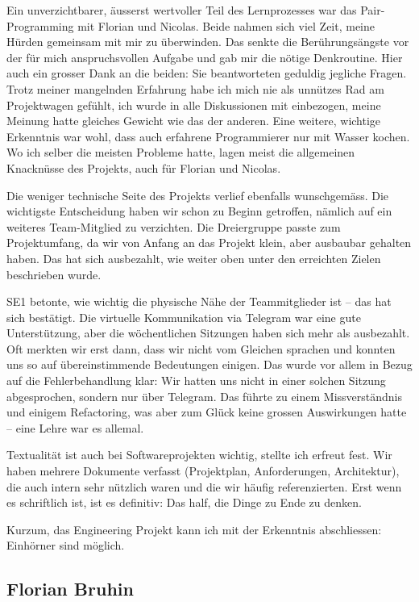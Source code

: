 \documentclass[a4paper]{article}
\begin{document}
Ein unverzichtbarer, äusserst wertvoller Teil des Lernprozesses war das Pair-Programming mit Florian und Nicolas. Beide nahmen sich viel Zeit, meine Hürden gemeinsam mit mir zu überwinden. Das senkte die Berührungsängste vor der für mich anspruchsvollen Aufgabe und gab mir die nötige Denkroutine. Hier auch ein grosser Dank an die beiden: Sie beantworteten geduldig jegliche Fragen. Trotz meiner mangelnden Erfahrung habe ich mich nie als unnützes Rad am Projektwagen gefühlt, ich wurde in alle Diskussionen mit einbezogen, meine Meinung hatte gleiches Gewicht wie das der anderen. Eine weitere, wichtige Erkenntnis war wohl, dass auch erfahrene Programmierer nur mit Wasser kochen. Wo ich selber die meisten Probleme hatte, lagen meist die allgemeinen Knacknüsse des Projekts, auch für Florian und Nicolas.

Die weniger technische Seite des Projekts verlief ebenfalls wunschgemäss. Die wichtigste Entscheidung haben wir schon zu Beginn getroffen, nämlich auf ein weiteres Team-Mitglied zu verzichten. Die Dreiergruppe passte zum Projektumfang, da wir von Anfang an das Projekt klein, aber ausbaubar gehalten haben. Das hat sich ausbezahlt, wie weiter oben unter den erreichten Zielen beschrieben wurde.

SE1 betonte, wie wichtig die physische Nähe der Teammitglieder ist -- das hat sich bestätigt. Die virtuelle Kommunikation via Telegram war eine gute Unterstützung, aber die wöchentlichen Sitzungen haben sich mehr als ausbezahlt. Oft merkten wir erst dann, dass wir nicht vom Gleichen sprachen und konnten uns so auf übereinstimmende Bedeutungen einigen. Das wurde vor allem in Bezug auf die Fehlerbehandlung klar: Wir hatten uns nicht in einer solchen Sitzung abgesprochen, sondern nur über Telegram. Das führte zu einem Missverständnis und einigem Refactoring, was aber zum Glück keine grossen Auswirkungen hatte -- eine Lehre war es allemal.

Textualität ist auch bei Softwareprojekten wichtig, stellte ich erfreut fest. Wir haben mehrere Dokumente verfasst (Projektplan, Anforderungen, Architektur), die auch intern sehr nützlich waren und die wir häufig referenzierten. Erst wenn es schriftlich ist, ist es definitiv: Das half, die Dinge zu Ende zu denken.

Kurzum, das Engineering Projekt kann ich mit der Erkenntnis abschliessen: Einhörner sind möglich.

\pagebreak

\subsection{Florian Bruhin}
\end{document}
